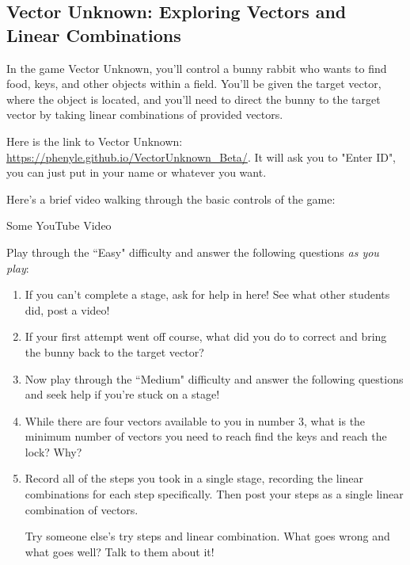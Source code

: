 \documentclass{ximera}
\begin{document}
  \subsection*{Vector Unknown: Exploring Vectors and Linear Combinations}

  In the game Vector Unknown, you'll control a bunny rabbit who wants to find food, keys, and other objects within a field. You'll be given the target vector, where the object is located, and you'll need to direct the bunny to the target vector by taking linear combinations of provided vectors. 

  Here is the link to Vector Unknown: \url{https://phenyle.github.io/VectorUnknown_Beta/}. It will ask you to "Enter ID", you can just put in your name or whatever you want.

  Here's a brief video walking through the basic controls of the game:

  \begin{center}
    Some YouTube Video
  \end{center}

  \begin{exploration}

  Play through the ``Easy" difficulty and answer the following questions \emph{as you play}:
  \begin{enumerate}

    \item If you can't complete a stage, ask for help in here! See what other students did, post a video!

    \item If your first attempt went off course, what did you do to correct and bring the bunny back to the target vector?
    

    \item Now play through the ``Medium" difficulty and answer the following questions and seek help if you're stuck on a stage!
    
    \item While there are four vectors available to you in number 3, what is the minimum number of vectors you need to reach find the keys and reach the lock? Why?
    
    \item Record all of the steps you took in a single stage, recording the linear combinations for each step specifically. Then post your steps as a single linear combination of vectors.
    
    Try someone else's try steps and linear combination. What goes wrong and what goes well? Talk to them about it!

  \end{enumerate}
\end{exploration}
\end{document}

